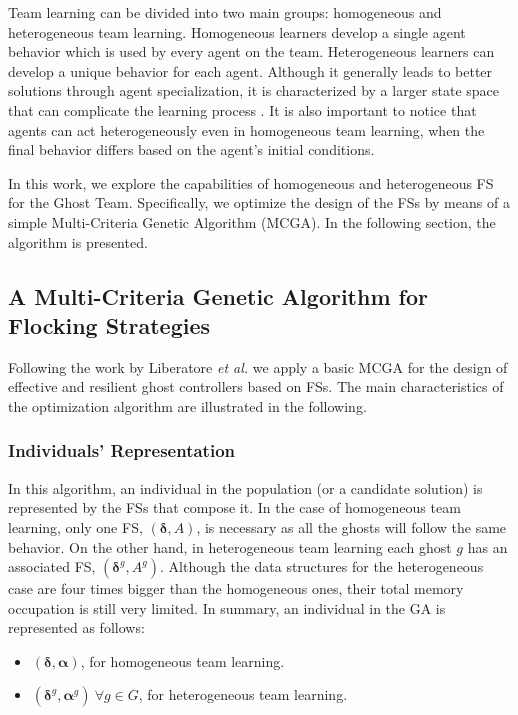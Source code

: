 \documentclass[journal]{IEEEtran}
\begin{document}
Team learning can be divided into two main groups: homogeneous and
heterogeneous team learning. Homogeneous learners develop a single
agent behavior which is used by every agent on the team. Heterogeneous
learners can develop a unique behavior for each agent. Although it
generally leads to better solutions through agent specialization, it
is characterized by a larger state space that can complicate the learning process . It is also
 important to notice that agents can act heterogeneously even in
 homogeneous team learning, when the final behavior differs based on
 the agent's initial conditions. 

In this work, we explore the capabilities of homogeneous and heterogeneous FS for the Ghost Team. Specifically, we optimize the design of the FSs by means of a simple Multi-Criteria Genetic Algorithm (MCGA). In the following section, the algorithm is presented.

\subsection{A Multi-Criteria Genetic Algorithm for Flocking Strategies}
Following the work by Liberatore \emph{et al.} \cite{Liberatore2014} we apply a basic MCGA for the design of effective and resilient ghost controllers based on FSs. The main characteristics of the optimization algorithm are illustrated in the following.

\subsubsection{Individuals' Representation}
In this algorithm, an individual in the population (or a candidate solution) is represented by the FSs that compose it. In the case of homogeneous team learning, only one FS, $(\boldsymbol\delta, A)$, is necessary as all the ghosts will follow the same behavior. On the other hand, in heterogeneous team learning each ghost $g$ has an associated FS, $(\boldsymbol\delta^g, A^g)$. Although the data structures for the heterogeneous case are four times bigger than the homogeneous ones, their total memory occupation is still very limited. In summary, an individual in the GA is represented as follows:

\begin{itemize}
  \item $(\boldsymbol\delta, \boldsymbol\alpha)$, for homogeneous team learning.
  \item $(\boldsymbol\delta^g, \boldsymbol\alpha^g)\: \forall g \in G$, for heterogeneous team learning.
\end{itemize}
\end{document}
